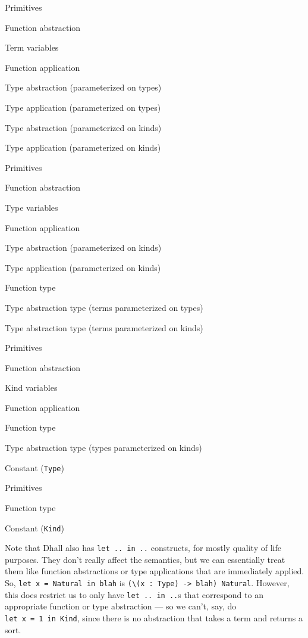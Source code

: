 \documentclass[]{article}
\begin{document}
\begin{description}
\tightlist
\item[Term]
Primitives

Function abstraction

Term variables

Function application

Type abstraction (parameterized on types)

Type application (parameterized on types)

Type abstraction (parameterized on kinds)

Type application (parameterized on kinds)
\item[Type]
Primitives

Function abstraction

Type variables

Function application

Type abstraction (parameterized on kinds)

Type application (parameterized on kinds)

Function type

Type abstraction type (terms parameterized on types)

Type abstraction type (terms parameterized on kinds)
\item[Kind]
Primitives

Function abstraction

Kind variables

Function application

Function type

Type abstraction type (types parameterized on kinds)

Constant (\texttt{Type})
\item[Sort]
Primitives

Function type

Constant (\texttt{Kind})
\end{description}

Note that Dhall also has \texttt{let\ ..\ in\ ..} constructs, for mostly quality
of life purposes. They don't really affect the semantics, but we can essentially
treat them like function abstractions or type applications that are immediately
applied. So, \texttt{let\ x\ =\ Natural\ in\ blah} is
\texttt{(\textbackslash{}(x\ :\ Type)\ -\textgreater{}\ blah)\ Natural}.
However, this does restrict us to only have \texttt{let\ ..\ in\ ..}s that
correspond to an appropriate function or type abstraction --- so we can't, say,
do \texttt{let\ x\ =\ 1\ in\ Kind}, since there is no abstraction that takes a
term and returns a sort.
\end{document}
